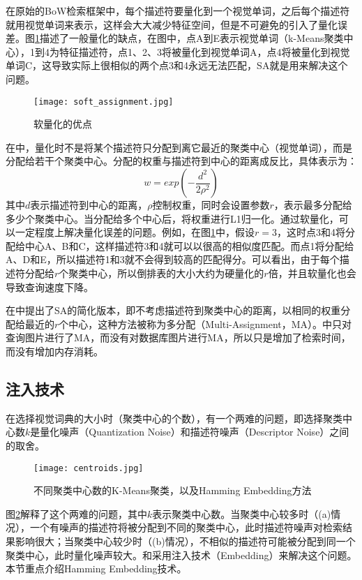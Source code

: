 在原始的BoW检索框架中，每个描述符要量化到一个视觉单词，之后每个描述符就用视觉单词来表示，这样会大大减少特征空间，但是不可避免的引入了量化误差。图\ref{fig:sa}描述了一般量化的缺点，在图中，点A到E表示视觉单词（k-Means聚类中心），1到4为特征描述符，点1、2、3将被量化到视觉单词A，点4将被量化到视觉单词C，这导致实际上很相似的两个点3和4永远无法匹配，SA就是用来解决这个问题。
\begin{figure}
	\centering
	\texttt{[image: soft\_assignment.jpg]}
	\caption{软量化的优点}\label{fig:sa}
\end{figure}
在\cite{philbin2008lost}中，量化时不是将某个描述符只分配到离它最近的聚类中心（视觉单词），而是分配给若干个聚类中心。分配的权重与描述符到中心的距离成反比，具体表示为：
\begin{equation}
w=exp(-\frac{d^2}{2\rho^2})
\end{equation}
其中$d$表示描述符到中心的距离，$\rho$控制权重，同时会设置参数$r$，表示最多分配给多少个聚类中心。当分配给多个中心后，将权重进行L1归一化。通过软量化，可以一定程度上解决量化误差的问题。例如，在图\ref{fig:sa}中，假设$r=3$，这时点3和4将分配给中心A、B和C，这样描述符3和4就可以以很高的相似度匹配。而点1将分配给A、D和E，所以描述符1和3就不会得到较高的匹配得分。可以看出，由于每个描述符分配给$r$个聚类中心，所以倒排表的大小大约为硬量化的$r$倍，并且软量化也会导致查询速度下降。

在\cite{jegou2009burstiness}中提出了SA的简化版本，即不考虑描述符到聚类中心的距离，以相同的权重分配给最近的$r$个中心，这种方法被称为多分配（Multi-Assignment，MA）。\cite{jegou2009burstiness}中只对查询图片进行了MA，而没有对数据库图片进行MA，所以只是增加了检索时间，而没有增加内存消耗。

\subsection{注入技术}
在选择视觉词典的大小时（聚类中心的个数），有一个两难的问题，即选择聚类中心数$k$是量化噪声（Quantization Noise）和描述符噪声（Descriptor Noise）之间的取舍\cite{jegou2008hamming}。
\begin{figure}[h]
	\centering
	\texttt{[image: centroids.jpg]}
	\caption{不同聚类中心数的K-Means聚类，以及Hamming Embedding方法}\label{fig:centroids}
\end{figure}
图\ref{fig:centroids}解释了这个两难的问题，其中$k$表示聚类中心数。当聚类中心较多时（(a)情况），一个有噪声的描述符将被分配到不同的聚类中心，此时描述符噪声对检索结果影响很大；当聚类中心较少时（(b)情况），不相似的描述符可能被分配到同一个聚类中心，此时量化噪声较大。\cite{jegou2008hamming}和\cite{jegou2014triangulation}采用注入技术（Embedding）来解决这个问题。本节重点介绍Hamming Embedding技术\cite{jegou2008hamming}。

